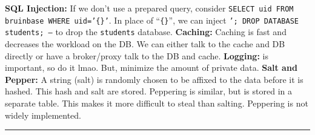 \documentclass{report}
\renewcommand{\bf}[1]{\textbf{{#1}}}
\renewcommand{\tt}[1]{\texttt{{#1}}}
\begin{document}
\bf{SQL Injection:} If we don't use a prepared query, consider
\tt{SELECT uid FROM bruinbase WHERE uid='\{\}'}. In place of ``\tt{\{\}}'', we can inject \tt{';
DROP DATABASE students; --} to drop the \tt{students} database.
\hfil \newline
\bf{Caching:} Caching is fast and decreases the workload on the DB. We can either talk to the cache
and DB directly or have a broker/proxy talk to the DB and cache.
\hfil \newline
\bf{Logging:} is important, so do it lmao. But, minimize the amount of private data.
\newpage
\bf{Salt and Pepper:} A string (salt) is randomly chosen to be affixed to the data before it is
hashed. This hash and salt are stored. Peppering is similar, but is stored in a separate table. This
makes it more difficult to steal than salting. Peppering is not widely implemented.
\hfil \newline
\vspace{-1em}
\hrule
\vspace{0.2em}
\end{document}
